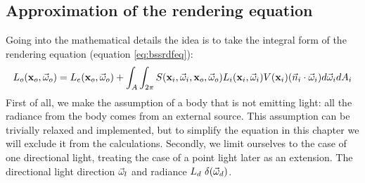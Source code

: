 \subsection{Approximation of the rendering equation}
Going into the mathematical details the idea is to take the integral form of the rendering equation (equation \ref{eq:bssrdfeq}):
\begin{equation*}
L_o(\mathbf{x}_o,\vec{\omega}_o) = L_e(\mathbf{x}_o,\vec{\omega}_o) + \int_A \int_{2\pi} S(\mathbf{x}_i, \vec{\omega}_i, \mathbf{x}_o, \vec{\omega}_o) L_i(\mathbf{x}_i,\vec{\omega}_i) V(\mathbf{x}_i) (\vec{n}_i \cdot \vec{\omega}_i) d\vec{\omega}_i d A_i
\end{equation*}
First of all, we make the assumption of a body that is not emitting light: all the radiance from the body comes from an external source. This assumption can be trivially relaxed and implemented, but to simplify the equation in this chapter we will exclude it from the calculations. Secondly, we limit ourselves to the case of one directional light, treating the case of a point light later as an extension. The directional light direction $\vec{\omega}_l$ and radiance $L_d \ \delta(\vec{\omega}_d)$.

